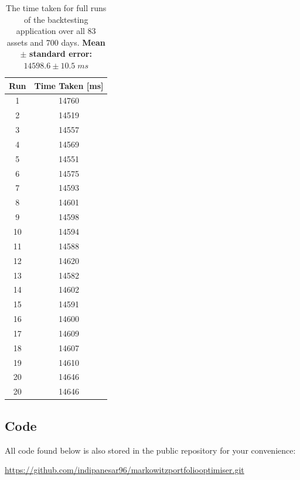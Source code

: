 \documentclass{article}
\begin{document}
\begin{center}
\begin{table}[H]
\begin{tabular}{|c c|} 
\hline
Run & Time Taken [ms]  \\ [0.5ex] 
\hline\hline
1 & 14760 \\
\hline
2 & 14519 \\
\hline
3 & 14557 \\
\hline
4 & 14569 \\
\hline
5 & 14551 \\
\hline
6 & 14575 \\
\hline
7 & 14593 \\
\hline
8 & 14601 \\
\hline
9 & 14598 \\
\hline
10 & 14594 \\
\hline
11 & 14588 \\
\hline
12 & 14620 \\
\hline
13 & 14582 \\
\hline
14 & 14602 \\
\hline
15 & 14591 \\
\hline
16 & 14600 \\
\hline
17 & 14609 \\
\hline
18 & 14607 \\
\hline
19 & 14610 \\
\hline
20 & 14646 \\ [1ex] 
20 & 14646 \\ [1ex] 
\hline
\end{tabular}
\caption{The time taken for full runs of the backtesting application over all 83 assets and 700 days. \textbf{Mean} $\pm$ \textbf{ standard error: } $14598.6 \pm 10.5\;ms$}
\label{table:timings}
\end{table}
\end{center}

\subsection{Code} 
\label{sec:code}

All code found below is also stored in the public repository for your convenience:

\href{https://github.com/indipanesar96/markowitzportfoliooptimiser.git}{https://github.com/indipanesar96/markowitzportfoliooptimiser.git}
\end{document}
